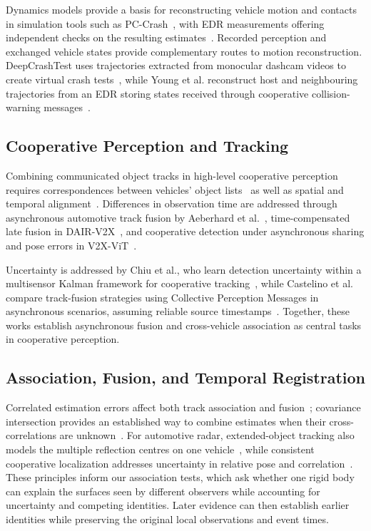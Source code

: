 Dynamics models provide a basis for reconstructing vehicle motion and
contacts in simulation tools such as PC-Crash~\cite{steffan1996pccrash},
with EDR measurements offering independent checks on the resulting
estimates~\cite{gabler2004edr}. Recorded perception and exchanged vehicle
states provide complementary routes to motion reconstruction.
DeepCrashTest uses trajectories extracted from monocular dashcam videos
to create virtual crash tests~\cite{bashetty2020deepcrashtest}, while Young
et al. reconstruct host and neighbouring trajectories from an EDR storing
states received through cooperative collision-warning
messages~\cite{young2009reconstruction}.

\subsection{Cooperative Perception and Tracking}

Combining communicated object tracks in high-level cooperative
perception~\cite{rauch2012car2x} requires correspondences between vehicles'
object lists~\cite{rauch2013association} as well as spatial and temporal
alignment~\cite{allig2019alignment}. Differences in observation time are
addressed through asynchronous automotive track fusion by Aeberhard
et al.~\cite{aeberhard2012asynchronous}, time-compensated late fusion in
DAIR-V2X~\cite{yu2022dairv2x}, and cooperative detection under asynchronous
sharing and pose errors in V2X-ViT~\cite{xu2022v2xvit}.

Uncertainty is addressed by Chiu et al., who learn detection uncertainty
within a multisensor Kalman framework for cooperative tracking~\cite{chiu2024dmstrack},
while Castelino et al. compare track-fusion strategies using Collective
Perception Messages in asynchronous scenarios, assuming reliable source
timestamps~\cite{castelino2026fusion}. Together, these works establish
asynchronous fusion and cross-vehicle association as central tasks in
cooperative perception.

\subsection{Association, Fusion, and Temporal Registration}

Correlated estimation errors affect both track association and
fusion~\cite{barshalom1981correlation,barshalom1986process}; covariance
intersection provides an established way to combine estimates when
their cross-correlations are unknown~\cite{julier1997intersection}.
For automotive radar, extended-object tracking also models the multiple
reflection centres on one vehicle~\cite{hammarstrand2012extended}, while
consistent cooperative localization addresses uncertainty in relative
pose and correlation~\cite{hery2021localization}. These principles inform
our association tests, which ask whether one rigid body can explain the
surfaces seen by different observers while accounting for uncertainty
and competing identities. Later evidence can then establish earlier
identities while preserving the original local observations and event times.

